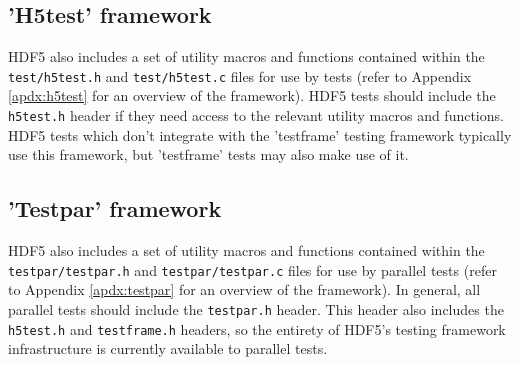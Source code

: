 \documentclass[../HDF5_RFC.tex]{subfiles}
\begin{document}
\subsection{'H5test' framework}

HDF5 also includes a set of utility macros and functions contained within the \texttt{test/h5test.h} and \texttt{test/h5test.c} files for use by tests (refer to Appendix \ref{apdx:h5test} for an overview of
the framework). HDF5 tests should include the \texttt{h5test.h} header if they need access to the relevant utility macros and functions. HDF5 tests which don't integrate with the 'testframe' testing framework
typically use this framework, but 'testframe' tests may also make use of it.

\subsection{'Testpar' framework}

HDF5 also includes a set of utility macros and functions contained within the \texttt{testpar/testpar.h}
and \texttt{testpar/testpar.c} files for use by parallel tests (refer to Appendix \ref{apdx:testpar} for
an overview of the framework). In general, all parallel tests should include the \texttt{testpar.h} header. This header also includes the \texttt{h5test.h} and \texttt{testframe.h} headers, so the entirety of HDF5's testing framework infrastructure is currently available to parallel tests.
\end{document}
